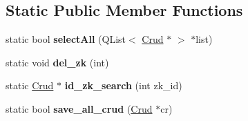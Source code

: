 \subsection*{Static Public Member Functions}
\begin{DoxyCompactItemize}
\item 
\mbox{\label{class_crud_a854a0400cf6a65e9f96ebf14e4b70840}} 
static bool {\bfseries select\+All} (Q\+List$<$ \mbox{\hyperlink{class_crud}{Crud}} $\ast$ $>$ $\ast$list)
\item 
\mbox{\label{class_crud_ae7e9eff478ac09c105802994e05e2f5e}} 
static void {\bfseries del\+\_\+zk} (int)
\item 
\mbox{\label{class_crud_a17a79ee46054261af1bd1daebbea9455}} 
static \mbox{\hyperlink{class_crud}{Crud}} $\ast$ {\bfseries id\+\_\+zk\+\_\+search} (int zk\+\_\+id)
\item 
\mbox{\label{class_crud_af43b20400a043f98cb52858382b57a0f}} 
static bool {\bfseries save\+\_\+all\+\_\+crud} (\mbox{\hyperlink{class_crud}{Crud}} $\ast$cr)
\end{DoxyCompactItemize}
